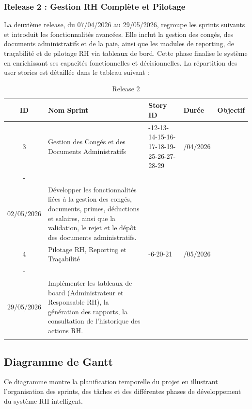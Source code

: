 \subsubsection*{Release 2 : Gestion RH Complète et Pilotage}
La deuxième release, du 07/04/2026 au 29/05/2026, regroupe les sprints suivants et introduit les fonctionnalités avancées. Elle inclut la gestion des congés, des documents administratifs et de la paie, ainsi que les modules de reporting, de traçabilité et de pilotage RH via tableaux de bord. Cette phase finalise le système en enrichissant ses capacités fonctionnelles et décisionnelles.
La répartition des user stories est détaillée dans le tableau suivant :
\begin{center}
\begin{longtable}{|c|>{\raggedright\arraybackslash}p{2.5cm}|
    >{\centering\arraybackslash}p{2.5cm}|
    >{\centering\arraybackslash}p{3cm}|
    >{\raggedright\arraybackslash}p{5cm}|}
\hline
\textbf{ID} & \textbf{Nom Sprint} & \textbf{Story ID} & \textbf{Durée} & \textbf{Objectif} \\
\hline
\endfirsthead

3 & Gestion  des Congés et des Documents Administratifs
  & 11-12-13-14-15-16-17-18-19-25-26-27-28-29
  & \centering07/04/2026 \\-\\02/05/2026
  & Développer les fonctionnalités liées à la gestion des congés, documents,
    primes, déductions et salaires, ainsi que la validation, le rejet et le
    dépôt des documents administratifs. \\ \hline
4 & Pilotage RH, Reporting et Traçabilité
  & 4-6-20-21
  & \centering 03/05/2026\\-\\29/05/2026
  & Implémenter les tableaux de board (Administrateur et Responsable RH),
    la génération des rapports, la consultation de l'historique des actions
    RH. \\ \hline
\caption{Release 2}
\end{longtable}
\end{center}

\subsection{Diagramme de Gantt}

Ce diagramme montre la planification temporelle du projet en illustrant l'organisation des
sprints, des tâches et des différentes phases de développement du système RH intelligent.

